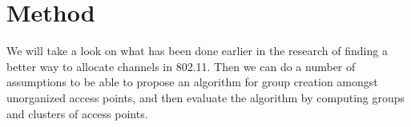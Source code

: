 \section{Method}
We will take a look on what has been done earlier in the research of finding a better way to allocate channels in 802.11. 
Then we can do a number of assumptions to be able to propose an algorithm for group creation amongst unorganized access points,
and then evaluate the algorithm by computing groups and clusters of access points.  

%
%
%
